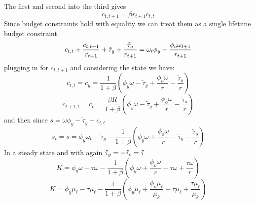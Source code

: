 \documentclass{sebase}
\begin{document}
The first and second into the third gives%
\begin{equation*}
c_{t,t+1}=\beta r_{t+1}c_{t,t}
\end{equation*}%
Since budget constraints hold with equality we can treat them as a single
lifetime budget constraint.%
\begin{equation*}
c_{t,t}+\frac{c_{t,t+1}}{r_{t+1}}+\tilde{\tau}_{y}+\frac{\tilde{\tau}_{o}}{%
r_{t+1}}=\omega _{t}\phi _{y}+\frac{\phi _{o}\omega _{t+1}}{r_{t+1}}
\end{equation*}%
plugging in for $c_{t,t+1}$ and considering the state we have: 
\begin{equation*}
c_{t,t}=c_{y}=\frac{1}{1+\beta }\left( \phi _{y}\omega -\tilde{\tau}_{y}+%
\frac{\phi _{o}\omega }{r}-\frac{\tilde{\tau}_{o}}{r}\right)
\end{equation*}%
\begin{equation*}
c_{t+1,t}=c_{o}=\frac{\beta R}{1+\beta }\left( \phi _{y}\omega -\tilde{\tau}%
_{y}+\frac{\phi _{o}\omega }{r}-\frac{\tilde{\tau}_{o}}{r}\right)
\end{equation*}%
and then since $s=\omega \phi _{y}-\tilde{\tau}_{y}-c_{t,t}$ 
\begin{equation*}
s_{t}=s=\phi _{y}\omega _{t}-\tilde{\tau}_{y}-\frac{1}{1+\beta }\left( \phi
_{y}\omega +\frac{\phi _{o}\omega }{r}-\tilde{\tau}_{y}-\frac{\tilde{\tau}%
_{o}}{r}\right)
\end{equation*}%
In a steady state and with again $\tilde{\tau}_{y}=-\tilde{\tau}_{o}=\tilde{%
\tau}$ 
\begin{equation*}
K=\phi _{y}\omega -\tau \omega -\frac{1}{1+\beta }\left( \phi _{y}\omega +%
\frac{\phi _{o}\omega }{r}-\tau \omega +\frac{\tau \omega }{r}\right)
\end{equation*}%
\begin{equation*}
K=\phi _{y}\mu _{\ell }-\tau \mu _{\ell }-\frac{1}{1+\beta }\left( \phi
_{y}\mu _{\ell }+\frac{\phi _{o}\mu _{\ell }}{\mu _{k}}-\tau \mu _{\ell }+%
\frac{\tau \mu _{\ell }}{\mu _{k}}\right)
\end{equation*}%
\pagebreak
\end{document}
